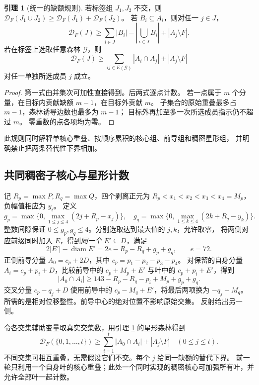 \documentclass[11pt,a4paper]{article}
\newcommand{\Def}{\mathcal D}
\theoremstyle{definition}
\newtheorem{lemma}[theorem]{引理}
\begin{document}
\begin{lemma}[统一的缺额规则]\label{deficit}
若标签组 $J_1,J_2$ 不交，则
$\Def_F(J_1\cup J_2)\ge\Def_F(J_1)+\Def_F(J_2)$。
若 $B_i\subseteq A_i$，则对任一 $j\in J$，
\[
 \Def_F(J)\ge\sum_{i\in J}|B_i|-\left|\bigcup_{i\in J}B_i\right|+|A_j\setminus F|.
\]
若在标签上选取任意森林 $\mathcal G$，则
\[
 \Def_F(J)\ge\sum_{ij\in E(\mathcal G)}|A_i\cap A_j|+|A_j\setminus F|
\]
对任一单独所选成员 $j$ 成立。
\end{lemma}
\begin{proof}
第一式由并集次可加性直接得到。后两式逐点计数。
若一点属于 $m$ 个分量，在目标内贡献缺额 $m-1$，在目标外贡献 $m$。
子集合的原始重叠最多占 $m-1$，森林诱导边数也最多为 $m-1$；
目标外再加至多一次所选成员指示仍不超过 $m$。
零重数的点各项均为零。
\end{proof}
此规则同时解释单核心重叠、按顺序累积的核心组、前导组和稠密星形组，
并明确禁止把两条替代性下界相加。

\subsection{共同稠密子核心与星形计数}
记 $R_p=\max P,R_q=\max Q$，四个剥离正元为
$R_p<x_1<x_2<x_3<x_4=M_p$，负幅值相应为 $y_i$。
定义
\[
 g_p=\max\{0,\max_{1\le j\le4}(2j+R_p-x_j)\},\quad
 g_q=\max\{0,\max_{1\le k\le4}(2k+R_q-y_k)\}.
\]
整数间隙保证 $0\le g_p,g_q\le4$。分别选取达到最大值的 $j,k$，允许取零，
将两侧对应前缀同时加入 $E$，得到\emph{同一个} $E'\subseteq D$，满足
\[
 2|E'|-\operatorname{diam}E'=2e-R_p-R_q+g_p+g_q,\qquad e=72.
\]
正侧前导分量 $A_0=c_p+2D$，其中 $c_p=p_1-p_2-p_3-p_4$。
对保留的自身分量 $A_i=c_p+p_i+D$，比较前导中的 $c_p+M_p+E'$ 与叶中的 $c_p+p_i+E'$，得到
\[
 |A_0\cap A_i|\ge143-R_p-R_q-p_i+M_p+g_p+g_q.
\]
交叉分量 $c_p-q_j+D$ 使用前导中的 $c_p-M_q+E'$，将最后两项换为 $-q_j+M_q$。
所需的是相对位移整性。前导中心的绝对位置不影响原始交集。
反射给出另一侧。

令各交集辅助变量取真实交集数，用引理 \ref{deficit} 的星形森林得到
\[
 \Def_F(\{0,1,\ldots,t\})\ge
 \sum_{i=1}^t|A_0\cap A_i|+|A_j\setminus F|\quad(0\le j\le t).
\]
不同交集可相互重叠，无需假设它们不交。每个 $j$ 给同一缺额的替代下界。
前一轮只利用一个自身叶的核心重叠；此处一个同时实现的稠密核心可加强所有叶，并允许全部叶一起计数。
\end{document}
